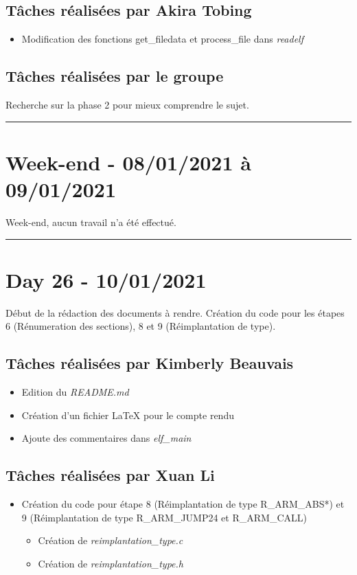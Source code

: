 \documentclass[11pt,letterpaper]{article}
\begin{document}
\subsection*{Tâches réalisées par Akira Tobing}
\begin{itemize}
    \item Modification des fonctions get\_filedata et process\_file dans \textit{readelf}
\end{itemize}

\subsection*{Tâches réalisées par le groupe}
Recherche sur la phase 2 pour mieux comprendre le sujet.

\noindent\rule{13cm}{0.4pt}

\section*{Week-end - 08/01/2021 à 09/01/2021}

Week-end, aucun travail n'a été effectué.

\noindent\rule{13cm}{0.4pt}

\section*{Day 26 - 10/01/2021}
Début de la rédaction des documents à rendre.
Création du code pour les étapes 6 (Rénumeration des sections), 8 et 9 
(Réimplantation de type).


\subsection*{Tâches réalisées par Kimberly Beauvais}
\begin{itemize}
    \item Edition du \textit{README.md}
    \item Création d'un fichier LaTeX pour le compte rendu 
    \item Ajoute des commentaires dans \textit{elf\_main}
\end{itemize}

\subsection*{Tâches réalisées par Xuan Li}
\begin{itemize}
    \item Création du code pour étape 8 (Réimplantation de type R\_ARM\_ABS*) et 
    9 (Réimplantation de type R\_ARM\_JUMP24 et R\_ARM\_CALL) 
    \begin{itemize}
        \item Création de \textit{reimplantation\_type.c}  
        \item Création de \textit{reimplantation\_type.h} 
    \end{itemize}
\end{itemize}
\end{document}
